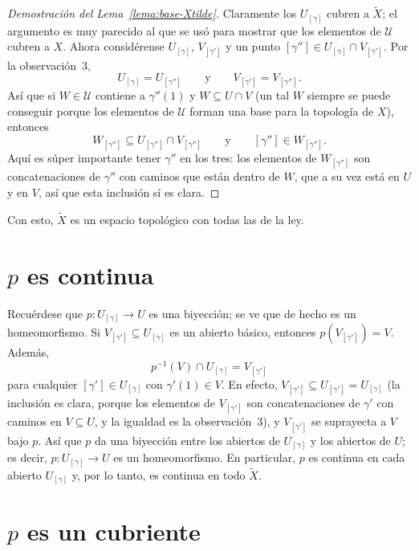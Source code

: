 \documentclass[11pt]{article}
\begin{document}
\begin{proof}[Demostración del Lema~\ref{lema:base-Xtilde}]
Claramente los $U_{[\gamma]}$ cubren a $\tilde X$; el argumento es muy parecido al que se usó para mostrar que los elementos de $\mathcal U$ cubren a $X$. Ahora considérense $U_{[\gamma]}$, $V_{[\gamma']}$ y un punto $[\gamma'']\in U_{[\gamma]}\cap V_{[\gamma']}$. Por la observación~3,
\[
  U_{[\gamma]}=U_{[\gamma'']}\qquad\text{y}\qquad V_{[\gamma']}=V_{[\gamma'']} .
\]
Así que si $W\in\mathcal U$ contiene a $\gamma''(1)$ y $W\subseteq U\cap V$ (un tal $W$ siempre se puede conseguir porque los elementos de $\mathcal U$ forman una base para la topología de $X$), entonces
\[
  W_{[\gamma'']}\subseteq U_{[\gamma'']}\cap V_{[\gamma'']}\qquad\text{y}\qquad[\gamma'']\in W_{[\gamma'']} .
\]
Aquí es súper importante tener $\gamma''$ en los tres: los elementos de $W_{[\gamma'']}$ son concatenaciones de $\gamma''$ con caminos que están dentro de $W$, que a su vez está en $U$ y en $V$, así que esta inclusión sí es clara.
\end{proof}

Con esto, $\tilde X$ es un espacio topológico con todas las de la ley.

\section*{$p$ es continua}

Recuérdese que $p\colon U_{[\gamma]}\to U$ es una biyección; se ve que de hecho es un homeomorfismo. Si $V_{[\gamma']}\subseteq U_{[\gamma]}$ es un abierto básico, entonces $p(V_{[\gamma']})=V$. Además,
\[
  p^{-1}(V)\cap U_{[\gamma]}=V_{[\gamma']}
\]
para cualquier $[\gamma']\in U_{[\gamma]}$ con $\gamma'(1)\in V$. En efecto, $V_{[\gamma']}\subseteq U_{[\gamma']}=U_{[\gamma]}$ (la inclusión es clara, porque los elementos de $V_{[\gamma']}$ son concatenaciones de $\gamma'$ con caminos en $V\subseteq U$, y la igualdad es la observación~3), y $V_{[\gamma']}$ se suprayecta a $V$ bajo $p$. Así que $p$ da una biyección entre los abiertos de $U_{[\gamma]}$ y los abiertos de $U$; es decir, $p\colon U_{[\gamma]}\to U$ es un homeomorfismo. En particular, $p$ es continua en cada abierto $U_{[\gamma]}$ y, por lo tanto, es continua en todo $\tilde X$.

\section*{$p$ es un cubriente}
\end{document}
